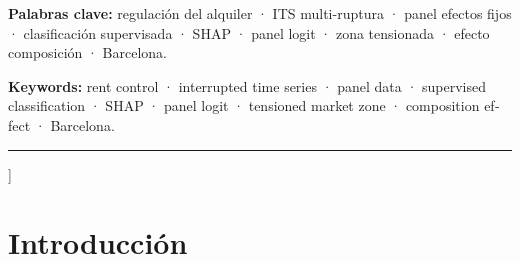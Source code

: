 \documentclass[10pt,a4paper,twocolumn]{article}
\begin{document}
{\begin{@twocolumnfalse}
\vspace{4pt}
\noindent\textbf{Palabras clave:} regulación del alquiler · ITS multi-ruptura · panel efectos
fijos · clasificación supervisada · SHAP · panel logit · zona tensionada · efecto composición · Barcelona.

\vspace{8pt}

\begin{otherlanguage}{english}
\begin{abstract}
\noindent
We analyze the habitual rental market in Barcelona across three successive regulatory
cycles (Law~11/2020, its annulment by the Constitutional Court in 2022, and Law~12/2023)
using quarterly data from Incasol -- Generalitat de Catalunya (10 districts, 2000Q1--2025Q3;
66 neighborhoods, 2014Q1--2025Q3), CPI from INE (base~2025), and Euribor from the Bank
of Spain. The analysis is structured around three questions: how regulation is associated
with contractual activity, where and when market tension emerges, and what impact
interventions have on price and volume. To address them, we employ fixed-effects panel
regression ($N{=}2{,}838$), supervised classification with lagged features and panel logit,
and SARIMAX$(1,1,1)(1,0,1)_4$ models with ITS-3 intervention analysis. Lag features raise
the Random Forest AUC from 0.553 to 0.684. The ITS-3 results show that Law~12/2023
reduces the number of habitual rental contracts and increases real prices, consistent with
a composition effect driven by selective supply withdrawal. Sensitivity analysis places the
critical substitution rate into short-term rentals at 20.3\%.
\end{abstract}
\vspace{4pt}
\noindent\textbf {Keywords:} rent control · interrupted time series · panel data · supervised classification
· SHAP · panel logit · tensioned market zone · composition effect · Barcelona.

\end{otherlanguage}

\vspace{10pt}\hrule\vspace{8pt}
\end{@twocolumnfalse}
}]

\section{Introducción}
\label{sec:intro}
\end{document}
